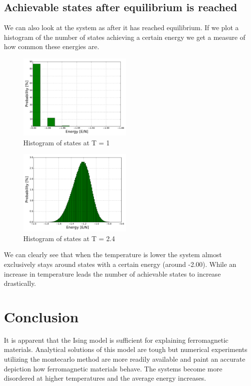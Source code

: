 \documentclass[a4paper, 12pt]{article}
\begin{document}
{	\subsection{Achievable states after equilibrium is reached}
	We can also look at the system as after it has reached equilibrium. If we plot a histogram of the number of states achieving a certain energy we get a measure of how common these energies are.
	\begin{figure}[H]
	\begin{center}
		\includegraphics[width=0.5\textwidth]{MC1000000T1-distN20-hist.pdf}
		\caption{Histogram of states at T = 1 }
	\end{center}
	\end{figure}

	\begin{figure}[H]
	\begin{center}
		\includegraphics[width=0.5\textwidth]{MC1000000T24-distN20-hist.pdf}
		\caption{Histogram of states at T = 2.4}
	\end{center}
	\end{figure}
	We can clearly see that when the temperature is lower the system almost exclusively stays around states with a certain energy (around -2.00). While an increase in temperature leads the number of achievable states to increase drastically.

	
\newpage
\section{Conclusion}
	It is apparent that the Ising model is sufficient for explaining ferromagnetic materials. Analytical solutions of this model are tough but numerical experiments utilizing the montecarlo method are more readily available and paint an accurate depiction how ferromagnetic materials behave. The systems become more disordered at higher temperatures and the average energy increases.

}
\end{document}
